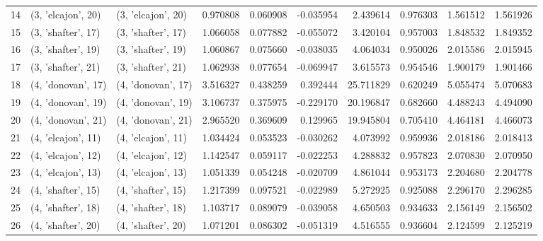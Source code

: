 \begin{tabular}{lllrrrrrrr}
14 &  (3, 'elcajon', 20) &  (3, 'elcajon', 20) &  0.970808 &   0.060908 & -0.035954 &   2.439614 &  0.976303 &   1.561512 &  1.561926 \\
15 &  (3, 'shafter', 17) &  (3, 'shafter', 17) &  1.066058 &   0.077882 & -0.055072 &   3.420104 &  0.957003 &   1.848532 &  1.849352 \\
16 &  (3, 'shafter', 19) &  (3, 'shafter', 19) &  1.060867 &   0.075660 & -0.038035 &   4.064034 &  0.950026 &   2.015586 &  2.015945 \\
17 &  (3, 'shafter', 21) &  (3, 'shafter', 21) &  1.062938 &   0.077654 & -0.069947 &   3.615573 &  0.954546 &   1.900179 &  1.901466 \\
18 &  (4, 'donovan', 17) &  (4, 'donovan', 17) &  3.516327 &   0.438259 &  0.392444 &  25.711829 &  0.620249 &   5.055474 &  5.070683 \\
19 &  (4, 'donovan', 19) &  (4, 'donovan', 19) &  3.106737 &   0.375975 & -0.229170 &  20.196847 &  0.682660 &   4.488243 &  4.494090 \\
20 &  (4, 'donovan', 21) &  (4, 'donovan', 21) &  2.965520 &   0.369609 &  0.129965 &  19.945804 &  0.705410 &   4.464181 &  4.466073 \\
21 &  (4, 'elcajon', 11) &  (4, 'elcajon', 11) &  1.034424 &   0.053523 & -0.030262 &   4.073992 &  0.959936 &   2.018186 &  2.018413 \\
22 &  (4, 'elcajon', 12) &  (4, 'elcajon', 12) &  1.142547 &   0.059117 & -0.022253 &   4.288832 &  0.957823 &   2.070830 &  2.070950 \\
23 &  (4, 'elcajon', 13) &  (4, 'elcajon', 13) &  1.051339 &   0.054248 & -0.020709 &   4.861044 &  0.953173 &   2.204680 &  2.204778 \\
24 &  (4, 'shafter', 15) &  (4, 'shafter', 15) &  1.217399 &   0.097521 & -0.022989 &   5.272925 &  0.925088 &   2.296170 &  2.296285 \\
25 &  (4, 'shafter', 18) &  (4, 'shafter', 18) &  1.103717 &   0.089079 & -0.039058 &   4.650503 &  0.934633 &   2.156149 &  2.156502 \\
26 &  (4, 'shafter', 20) &  (4, 'shafter', 20) &  1.071201 &   0.086302 & -0.051319 &   4.516555 &  0.936604 &   2.124599 &  2.125219 \\
\bottomrule
\end{tabular}
